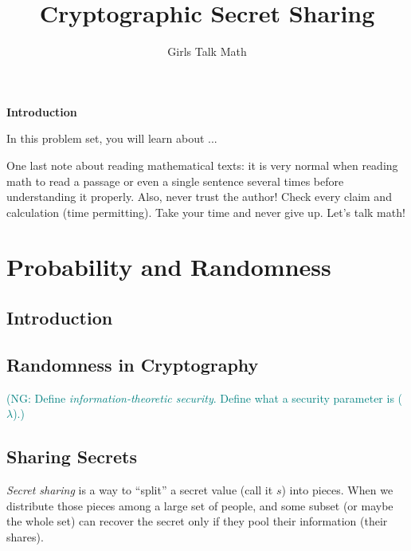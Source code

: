 \documentclass[12 pt]{article}
\title{Cryptographic Secret Sharing}
\author{Girls Talk Math}
\date{}
\newcommand{\nsm}[1]{\textcolor{teal}{(NG: #1)}}
\newcounter{exercise}[section]
\begin{document}
\maketitle
\vskip 1in
\begin{center} \textbf{Introduction} \end{center}

\indent In this problem set, you will learn about ...
    
    One last note about reading mathematical texts: it is very normal when reading math to read a passage or even a single sentence several times before understanding it properly. Also, never trust the author! Check every claim and calculation (time permitting). Take your time and never give up. Let's talk math!
	
\newpage

\tableofcontents



\newpage


\section{Probability and Randomness}

\subsection{Introduction}

\subsection{Randomness in Cryptography}
\nsm{Define \emph{information-theoretic security}.
Define what a security parameter is ($\lambda$).}

\subsection{Sharing Secrets}
\emph{Secret sharing} is a way to ``split'' a secret value (call it $s$) into pieces. When we distribute those pieces among a large set of people, and some subset (or maybe the whole set) can recover the secret only if they pool their information (their shares).
\end{document}
